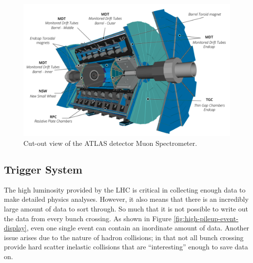 	\begin{figure}[!ht]
	\centering
	\includegraphics[width=\textwidth,keepaspectratio=true]{chapters/chapter2_experiment/images/ATLAS_Muon_System_Run3.png}
	\caption{Cut-out view of the ATLAS detector Muon Spectrometer.}
	\label{fig:muon-spec}
	\end{figure}

	\subsection{Trigger System}\label{ssec:trigger}
	The high luminosity provided by the LHC is critical in collecting enough data to make detailed physics analyses. However, it also means that there is an incredibly large amount of data to sort through. So much that it is not possible to write out the data from every bunch crossing. As shown in Figure \ref{fig:high-pileup-event-display}, even one single event can contain an inordinate amount of data. Another issue arises due to the nature of hadron collisions; in that not all bunch crossing provide hard scatter inelastic collisions that are ``interesting'' enough to save data on. 

